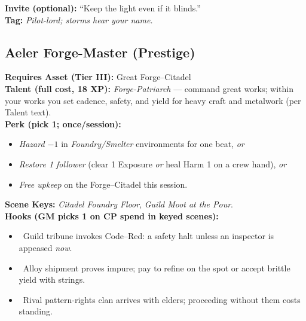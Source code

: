\documentclass[11pt]{article}
\begin{document}
\textbf{Invite (optional):} “Keep the light even if it blinds.”\\
\textbf{Tag:} \emph{Pilot-lord; storms hear your name.}


\subsection*{Aeler Forge-Master (Prestige)}
\textbf{Requires Asset (Tier III):} Great Forge–Citadel\\
\textbf{Talent (full cost, 18 XP):} \emph{Forge-Patriarch} — command great works; within your works you set cadence, safety, and yield for heavy craft and metalwork (per Talent text).\\
\textbf{Perk (pick 1; once/session):}
\begin{itemize}
  \item \emph{Hazard $-1$} in \emph{Foundry/Smelter} environments for one beat, \emph{or}
  \item \emph{Restore 1 follower} (clear 1 Exposure \emph{or} heal Harm 1 on a crew hand), \emph{or}
  \item \emph{Free upkeep} on the Forge–Citadel this session.
\end{itemize}
\textbf{Scene Keys:} \emph{Citadel Foundry Floor}, \emph{Guild Moot at the Pour}.\\[2pt]
\textbf{Hooks (GM picks 1 on CP spend in keyed scenes):}
\begin{itemize}
  \item \clubsuit~Guild tribune invokes Code–Red: a safety halt unless an inspector is appeased \emph{now}.
  \item \diamondsuit~Alloy shipment proves impure; pay to refine on the spot or accept brittle yield with strings.
  \item \heartsuit~Rival pattern-rights clan arrives with elders; proceeding without them costs standing.
\end{itemize}
\end{document}
